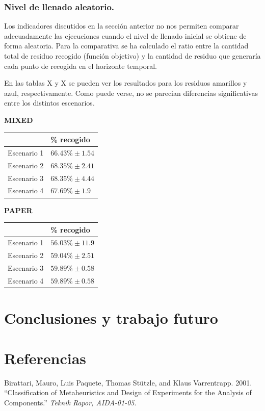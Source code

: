 \documentclass[
]{article}
\begin{document}
\hypertarget{nivel-de-llenado-aleatorio.}{%
\subsubsection{Nivel de llenado
aleatorio.}\label{nivel-de-llenado-aleatorio.}}

Los indicadores discutidos en la sección anterior no nos permiten
comparar adecuadamente las ejecuciones cuando el nivel de llenado
inicial se obtiene de forma aleatoria. Para la comparativa se ha
calculado el ratio entre la cantidad total de residuo recogido (función
objetivo) y la cantidad de residuo que generaría cada punto de recogida
en el horizonte temporal.

En las tablas X y X se pueden ver los resultados para los residuos
amarillos y azul, respectivamente. Como puede verse, no se parecian
diferencias significativas entre los distintos escenarios.

\textbf{MIXED}

\begin{longtable}[]{@{}ll@{}}
\toprule
& \% recogido\tabularnewline
\midrule
\endhead
Escenario 1 & \(66.43\% \pm 1.54\)\tabularnewline
Escenario 2 & \(68.35\% \pm 2.41\)\tabularnewline
Escenario 3 & \(68.35\% \pm 4.44\)\tabularnewline
Escenario 4 & \(67.69\% \pm 1.9\)\tabularnewline
\bottomrule
\end{longtable}

\textbf{PAPER}

\begin{longtable}[]{@{}ll@{}}
\toprule
& \% recogido\tabularnewline
\midrule
\endhead
Escenario 1 & \(56.03\% \pm 11.9\)\tabularnewline
Escenario 2 & \(59.04\% \pm 2.51\)\tabularnewline
Escenario 3 & \(59.89\% \pm 0.58\)\tabularnewline
Escenario 4 & \(59.89\% \pm 0.58\)\tabularnewline
\bottomrule
\end{longtable}

\hypertarget{conclusiones-y-trabajo-futuro}{%
\section{Conclusiones y trabajo
futuro}\label{conclusiones-y-trabajo-futuro}}

\hypertarget{referencias}{%
\section*{Referencias}\label{referencias}}

\hypertarget{refs}{}
\leavevmode\hypertarget{ref-birattari_classification_2001}{}%
Birattari, Mauro, Luis Paquete, Thomas Stützle, and Klaus Varrentrapp.
2001. ``Classification of Metaheuristics and Design of Experiments for
the Analysis of Components.'' \emph{Teknik Rapor, AIDA-01-05}.
\end{document}
